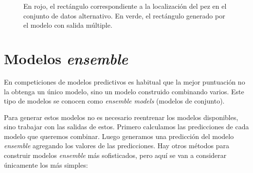 \begin{figure}
  \caption{En rojo, el rectángulo correspondiente a la localización del pez en
  el conjunto de datos alternativo. En verde, el rectángulo generado por el
  modelo con salida múltiple.}
\label{predicted_boxes_1}
\end{figure}


\section{Modelos \textit{ensemble}}

En competiciones de modelos predictivos es habitual que la mejor puntuación
no la obtenga un único modelo, sino un modelo construido combinando varios. Este
tipo de modelos se conocen como \textit{ensemble models} (modelos de conjunto).

Para generar estos modelos no es necesario reentrenar los modelos disponibles,
sino trabajar con las salidas de estos. Primero calculamos las predicciones de
cada modelo que queremos combinar. Luego generamos una predicción del modelo
\textit{ensemble} agregando los valores de las predicciones. Hay otros métodos
para construir modelos \textit{ensemble} más sofisticados, pero aquí se van a
considerar únicamente los más simples:


